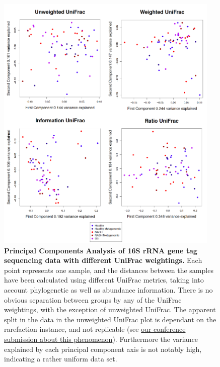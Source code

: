 \begin{figure}[h]
\begin{center}
\includegraphics[width=0.95\textwidth]{nafld_16s_pcoa.png}
\caption{\textbf{Principal Components Analysis of 16S rRNA gene tag sequencing data with different UniFrac weightings.} Each point represents one sample, and the distances between the samples have been calculated using different UniFrac metrics, taking into account phylogenetic as well as abundance information. There is no obvious separation between groups by any of the UniFrac weightings, with the exception of unweighted UniFrac. The apparent split in the data in the unweighted UniFrac plot is dependant on the rarefaction instance, and not replicable (see \href{https://github.com/ruthgrace/unifrac_paper/blob/master/expanding_the_unifrac_toolbox.pdf}{our conference submission about this phenomenon}). Furthermore the variance explained by each principal component axis is not notably high, indicating a rather uniform data set.}
\end{center}
\label{nafld_fig2}
\end{figure}

